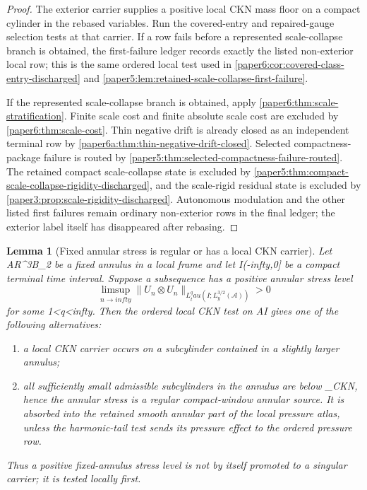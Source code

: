 \documentclass[11pt]{amsart}
\def\({}%
\def\){}%
\def\mathbb#1{#1}%
\def\tau{tau}%
\def\infty{infty}%
\theoremstyle{plain}
\newtheorem{lemma}[lemma]{Lemma}
\theoremstyle{definition}
\theoremstyle{remark}
\begin{document}
\begin{proof}
The exterior carrier supplies a positive local CKN mass floor on a compact
cylinder in the rebased variables.  Run the covered-entry and repaired-gauge
selection tests at that carrier.  If a row fails before a represented
scale-collapse branch is obtained, the first-failure ledger records exactly the
listed non-exterior local row; this is the same ordered local test used in
\cref{paper6:cor:covered-class-entry-discharged} and
\cref{paper5:lem:retained-scale-collapse-first-failure}.
\par
If the represented scale-collapse branch is obtained, apply
\cref{paper6:thm:scale-stratification}.  Finite scale cost and finite absolute
scale cost are excluded by \cref{paper6:thm:scale-cost}.  Thin negative drift
is already closed as an independent terminal row by
\cref{paper6a:thm:thin-negative-drift-closed}.  Selected compactness-package
failure is routed by
\cref{paper5:thm:selected-compactness-failure-routed}.  The retained compact
scale-collapse state is excluded by
\cref{paper5:thm:compact-scale-collapse-rigidity-discharged}, and the
scale-rigid residual state is excluded by
\cref{paper3:prop:scale-rigidity-discharged}.  Autonomous modulation and the
other listed first failures remain ordinary non-exterior rows in the final
ledger; the exterior label itself has disappeared after rebasing.
\end{proof}

\begin{lemma}[Fixed annular stress is regular or has a local CKN carrier]
\label{paper8:lem:fixed-annular-stress-ckn-dichotomy}
Let \(\mathcal A\Subset\mathbb R^3\setminus B_2\) be a fixed annulus in a
local frame and let \(I\Subset(-\infty,0]\) be a compact terminal time
interval.  Suppose a subsequence has a positive annular stress level
\[
  \limsup_{n\to\infty}
  \|U_n\otimes U_n\|_{L^q_\tau(I;L^{3/2}_y(\mathcal A))}>0
\]
for some \(1<q<\infty\).  Then the ordered local CKN test on
\(\mathcal A\times I\) gives one of the following alternatives:
\begin{enumerate}[label=\textup{(\roman*)}]
\item a local CKN carrier occurs on a subcylinder contained in a
slightly larger annulus;
\item all sufficiently small admissible subcylinders in the annulus are below
\(\varepsilon_{\rm CKN}\), hence the annular stress is a regular
compact-window annular source.  It is absorbed into the retained smooth
annular part of the local pressure atlas, unless the harmonic-tail test sends
its pressure effect to the ordered pressure row.
\end{enumerate}
Thus a positive fixed-annulus stress level is not by itself promoted to a
singular carrier; it is tested locally first.
\end{lemma}
\end{document}
